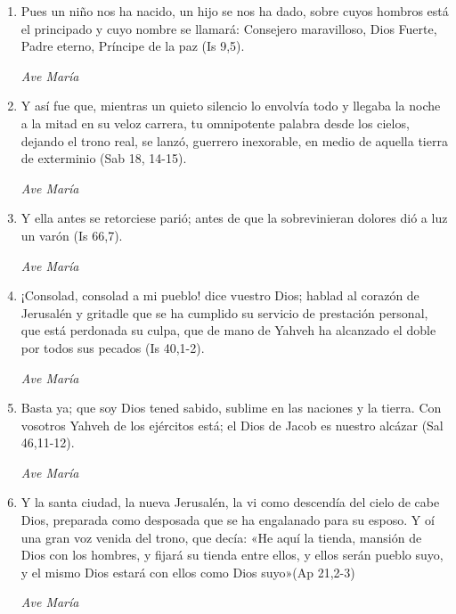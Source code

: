 \documentclass[a4paper,11pt, oneside]{report}
\begin{document}
        \begin{enumerate}
          
          \item Pues un niño nos ha nacido, un hijo se nos ha dado, sobre cuyos hombros está el principado y cuyo nombre se llamará: Consejero maravilloso, Dios Fuerte, Padre eterno, Príncipe de la paz (Is 9,5).
          
          \textit{Ave María}

          \item Y así fue que, mientras un quieto silencio lo envolvía todo y llegaba la noche a la mitad en su veloz carrera, tu omnipotente palabra desde los cielos, dejando el trono real, se lanzó, guerrero inexorable, en medio de aquella tierra de exterminio (Sab 18, 14-15).
          
          \textit{Ave María}

          \item Y ella antes se retorciese parió; antes de que la sobrevinieran dolores dió a luz un varón (Is 66,7).
          
          \textit{Ave María}

          \item ¡Consolad, consolad a mi pueblo! dice vuestro Dios; hablad al corazón de Jerusalén y gritadle que se ha cumplido su servicio de prestación personal, que está perdonada su culpa, que de mano de Yahveh ha alcanzado el doble por todos sus pecados (Is 40,1-2).
          
          \textit{Ave María}

          \item Basta ya; que soy Dios tened sabido, sublime en las naciones y la tierra. Con vosotros Yahveh de los ejércitos está; el Dios de Jacob es nuestro alcázar (Sal 46,11-12).

          \textit{Ave María}

          \item Y la santa ciudad, la nueva Jerusalén, la vi como descendía del cielo de cabe Dios, preparada como desposada que se ha engalanado para su esposo. Y oí una gran voz venida del trono, que decía: «He aquí la tienda, mansión de Dios con los hombres, y fijará su tienda entre ellos, y ellos serán pueblo suyo, y el mismo Dios estará con ellos como Dios suyo»(Ap 21,2-3)
          
          \textit{Ave María}


\end{enumerate}
\end{document}
